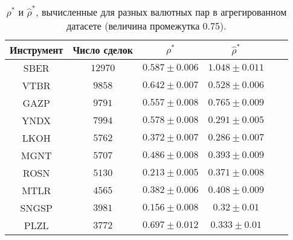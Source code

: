\begin{table}[h!]
    \begin{center}
        \begin{tabular}{|c|c|c|c|c|c|}
            \hline
            Инструмент & Число сделок & $\rho^*$ & $\hat \rho^*$            \\ \hline
            SBER & $12970$ & $0.587 \pm 0.006$ & $1.048 \pm 0.011$ \\ \hline
            VTBR       & $9858$       & $0.642 \pm 0.007$ & $0.528 \pm 0.006$ \\ \hline
            GAZP       & $9791$       & $0.557 \pm 0.008$ & $0.765 \pm 0.009$ \\ \hline
            YNDX       & $7994$       & $0.578 \pm 0.008$ & $0.291 \pm 0.005$ \\ \hline
            LKOH       & $5762$       & $0.372 \pm 0.007$ & $0.286 \pm 0.007$ \\ \hline
            MGNT       & $5707$       & $0.486 \pm 0.008$ & $0.393 \pm 0.009$ \\ \hline
            ROSN       & $5130$       & $0.213 \pm 0.005$ & $0.371 \pm 0.008$ \\ \hline
            MTLR       & $4565$       & $0.382 \pm 0.006$ & $0.408 \pm 0.009$ \\ \hline
            SNGSP      & $3981$       & $0.156 \pm 0.008$ & $0.32 \pm 0.01$   \\ \hline
            PLZL       & $3772$       & $0.697 \pm 0.012$ & $0.333 \pm 0.01$  \\ \hline
        \end{tabular}
    \end{center}\caption{$\rho^*$ и $\hat \rho^*$, вычисленные для разных валютных пар в агрегированном датасете (величина промежутка 0.75).}
    \label{Aggreg1CU0.75} \end{table}

